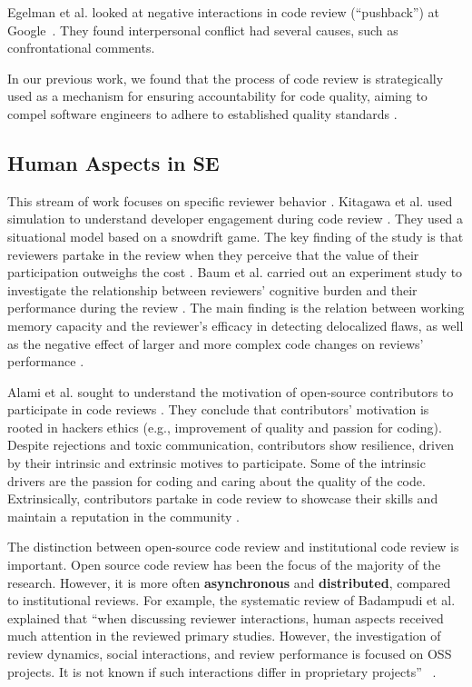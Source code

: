 Egelman et al. looked at negative interactions in code review (``pushback'') at Google~\citep{Egelman2020}. They found interpersonal conflict had several causes, such as confrontational comments. 

In our previous work, we found that the process of code review is strategically used as a mechanism for ensuring accountability for code quality, aiming to compel software engineers to adhere to established quality standards \citep{alami2024understanding}.

\subsection{Human Aspects in SE}

This stream of work focuses on specific reviewer behavior \citep{davila2021systematic}. Kitagawa et al. used simulation to understand developer engagement during code review \citep{kitagawa2016code}. They used a situational model based on a snowdrift game. The key finding of the study is that reviewers partake in the review when they perceive that the value of their participation outweighs the cost \citep{kitagawa2016code}. Baum et al. carried out an experiment study to investigate the relationship between reviewers' cognitive burden and their performance during the review \citep{baum2019associating}. The main finding is the relation between working memory capacity and the reviewer's efficacy in detecting delocalized flaws, as well as the negative effect of larger and more complex code changes on reviews' performance \citep{baum2019associating}.

Alami et al. sought to understand the motivation of open-source contributors to participate in code reviews \citep{alami2019does}. They conclude that contributors' motivation is rooted in hackers ethics (e.g., improvement of quality and passion for coding). Despite rejections and toxic communication, contributors show resilience, driven by their intrinsic and extrinsic motives to participate. Some of the intrinsic drivers are the passion for coding and caring about the quality of the code. Extrinsically, contributors partake in code review to showcase their skills and maintain a reputation in the community \citep{alami2019does}.

The distinction between open-source code review and institutional code review is important. Open source code review has been the focus of the majority of the research. However, it is more often \textbf{asynchronous} and \textbf{distributed}, compared to institutional reviews. For example, the systematic review of Badampudi et al.~\citep{badampudi2023modern} explained that ``when discussing reviewer interactions, human aspects received much attention in the reviewed primary studies. However, the investigation of review dynamics, social interactions, and review performance is focused on OSS projects. It is not known if such interactions differ in proprietary projects'' ~\citep{badampudi2023modern}.

